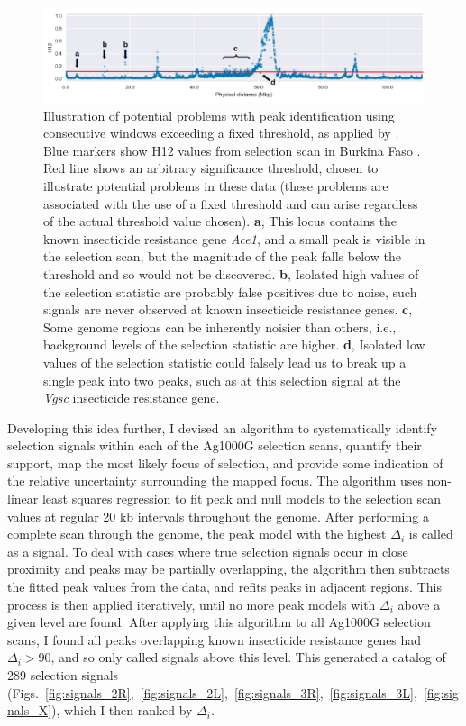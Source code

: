 \documentclass[a4paper,11pt,abstracton,hidelinks]{scrartcl}
\begin{document}
\begin{figure}[t!]
\centering
\includegraphics[width=1.1\textwidth,center]{artwork/chapter5/peak_problems.pdf}
\caption{Illustration of potential problems with peak identification using consecutive windows exceeding a fixed threshold, as applied by \textcite{Garud2015}.
%
Blue markers show H12 values from selection scan in Burkina Faso \agam.
%
Red line shows an arbitrary significance threshold, chosen to illustrate potential problems in these data (these problems are associated with the use of a fixed threshold and can arise regardless of the actual threshold value chosen).
%
\textbf{a}, This locus contains the known insecticide resistance gene \textit{Ace1}, and a small peak is visible in the selection scan, but the magnitude of the peak falls below the threshold and so would not be discovered.
%
\textbf{b}, Isolated high values of the selection statistic are probably false positives due to noise, such signals are never observed at known insecticide resistance genes.
%
\textbf{c}, Some genome regions can be inherently noisier than others, i.e., background levels of the selection statistic are higher.
%
\textbf{d}, Isolated low values of the selection statistic could falsely lead us to break up a single peak into two peaks, such as at this selection signal at the \textit{Vgsc} insecticide resistance gene.
}
\label{fig:peak_problems}
\end{figure}


Developing this idea further, I devised an algorithm to systematically identify selection signals within each of the Ag1000G selection scans, quantify their support, map the most likely focus of selection, and provide some indication of the relative uncertainty surrounding the mapped focus.
%
The algorithm uses non-linear least squares regression to fit peak and null models to the selection scan values at regular 20 kb intervals throughout the genome.
%
After performing a complete scan through the genome, the peak model with the highest $\Delta_i$ is called as a signal.
%
To deal with cases where true selection signals occur in close proximity and peaks may be partially overlapping, the algorithm then subtracts the fitted peak values from the data, and refits peaks in adjacent regions.
%
This process is then applied iteratively, until no more peak models with $\Delta_i$ above a given level are found.
%
After applying this algorithm to all Ag1000G selection scans, I found all peaks overlapping known insecticide resistance genes had $\Delta_i > 90$, and so only called signals above this level.
%
This generated a catalog of 289 selection signals (Figs.~\ref{fig:signals_2R},~\ref{fig:signals_2L},~\ref{fig:signals_3R},~\ref{fig:signals_3L},~\ref{fig:signals_X}), which I then ranked by $\Delta_i$.
%
\end{document}
